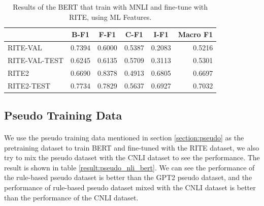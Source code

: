 \documentclass[12pt]{article}
\begin{document}
\begin{CJK*}{UTF8}{bkai}
\begin{spacing}{1.77}
\begin{table}[!ht]
  \centering
  \begin{tabular}{|l|r|r|r|r|r|}
  \hline
   & \multicolumn{1}{c|}{B-F1} & \multicolumn{1}{c|}{F-F1} & \multicolumn{1}{c|}{C-F1} & \multicolumn{1}{c|}{I-F1} & \multicolumn{1}{c|}{Macro F1} \\ \hline
  RITE-VAL & 0.7394 & 0.6000 & 0.5387 & 0.2083 & 0.5216 \\ \hline
  RITE-VAL-TEST & 0.6245 & 0.6135 & 0.5709 & 0.3113 & 0.5301 \\ \hline
  RITE2 & 0.6690 & 0.8378 & 0.4913 & 0.6805 & 0.6697 \\ \hline
  RITE2-TEST & 0.7734 & 0.7829 & 0.5637 & 0.6927 & 0.7032 \\ \hline
  \end{tabular}
  \caption{Results of the BERT that train with MNLI and fine-tune with RITE, using ML Features.}
  \label{result:bert_mnli_ft}
\end{table}

\subsection{Pseudo Training Data}
\paragraph{}
We use the pseudo training data mentioned in section \ref{section:pseudo} as the pretraining dataset to train BERT and fine-tuned with the RITE dataset, we also try to mix the pseudo dataset with the CNLI dataset to see the performance. The result is shown in table \ref{result:pseudo_nli_bert}. We can see the performance of the rule-based pseudo dataset is better than the GPT2 pseudo dataset, and the performance of rule-based pseudo dataset mixed with the CNLI dataset is better than the performance of the CNLI dataset.


\end{spacing}
\end{CJK*}
\end{document}
